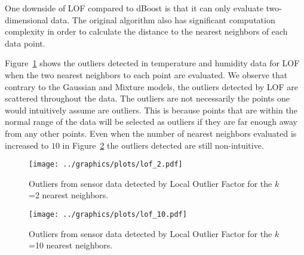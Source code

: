 One downside of LOF compared to dBoost is that it can only evaluate two-dimensional data.
The original algorithm also has significant computation complexity in order to calculate the distance to the nearest neighbors of each data point.

Figure~\ref{fig:lof_2} shows the outliers detected in temperature and humidity data for LOF when the two nearest neighbors to each point are evaluated.
We observe that contrary to the Gaussian and Mixture models, the outliers detected by LOF are scattered throughout the data.
The outliers are not necessarily the points one would intuitively assume are outliers.
This is because points that are within the normal range of the data will be selected as outliers if they are far enough away from any other points.
Even when the number of nearest neighbors evaluated is increased to $10$ in Figure~\ref{fig:lof_10} the outliers detected are still non-intuitive.

\begin{figure}[h]
\centering
\texttt{[image: ../graphics/plots/lof\_2.pdf]}
\caption{Outliers from sensor data detected by Local Outlier Factor for the $k$=2 nearest neighbors.}
\label{fig:lof_2}
\end{figure}
\begin{figure}[h]
\centering
\texttt{[image: ../graphics/plots/lof\_10.pdf]}
\caption{Outliers from sensor data detected by Local Outlier Factor for the $k$=10 nearest neighbors.}
\label{fig:lof_10}
\end{figure}
